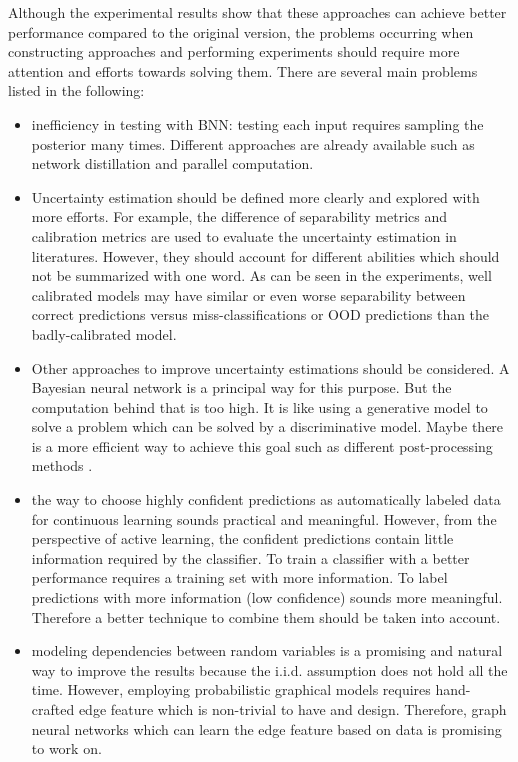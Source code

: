 Although the experimental results show that these approaches can achieve better performance compared to the original version, the problems occurring when constructing approaches and performing experiments should require more attention and efforts towards solving them. There are several main problems listed in the following:
\begin{itemize}
	\item inefficiency in testing with \gls{BNN}: testing each input requires sampling the posterior many times. Different approaches are already available such as network\cite{hinton2015distilling} distillation and parallel computation.  

	\item Uncertainty estimation should be defined more clearly and explored with more efforts. For example, the difference of separability metrics and calibration metrics are used to evaluate the uncertainty estimation in literatures\cite{hendrycks2016baseline}\cite{guo2017calibration}. However, they should account for different abilities which should not be summarized with one word. As can be seen in the experiments, well calibrated models may have similar or even worse separability between correct predictions versus miss-classifications or OOD predictions than the badly-calibrated model. 
	
	\item Other approaches to improve uncertainty estimations should be considered. A Bayesian neural network is a principal way for this purpose. But the computation behind that is too high. It is like using a generative model to solve a problem which can be solved by a discriminative model. Maybe there is a more efficient way to achieve this goal such as different post-processing methods \cite{guo2017calibration}. 
	
	\item the way to choose highly confident predictions as automatically labeled data for continuous learning sounds practical and meaningful. However, from the perspective of active learning, the confident predictions contain little information required by the classifier. To train a classifier with a better performance requires a training set with more information. To label predictions with more information (low confidence) sounds more meaningful. Therefore a better technique to combine them should be taken into account. 
	
	\item modeling dependencies between random variables is a promising and natural way to improve the results because the i.i.d. assumption does not hold all the time. However, employing probabilistic graphical models requires hand-crafted edge feature which is non-trivial to have and design. Therefore, graph neural networks which can learn the edge feature based on data is promising to work on.
\end{itemize} 

